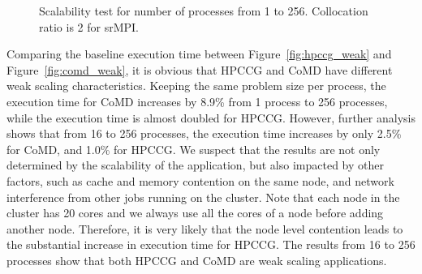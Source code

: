 \begin{figure}[!t]
	\begin{center}
	\end{center}
	\caption{Scalability test for number of processes from 1 to 256. Collocation ratio is 2 for srMPI.}
	\label{fig:scalability}
    \vspace{-0.1in}
\end{figure}

Comparing the baseline execution time between Figure~\ref{fig:hpccg_weak} and Figure~\ref{fig:comd_weak}, it is obvious that HPCCG and CoMD have different weak scaling characteristics. Keeping the same problem size per process, the execution time for CoMD increases by 8.9\% from 1 process to 256 processes, while the execution time is almost doubled for HPCCG. However, further analysis shows that from 16 to 256 processes, the execution time increases by only 2.5\% for CoMD, and 1.0\% for HPCCG. We suspect that the results are not only determined by the scalability of the application, but also impacted by other factors, such as cache and memory contention on the same node, and network interference from other jobs running on the cluster. Note that each node in the cluster has 20 cores and we always use all the cores of a node before adding another node. Therefore, it is very likely that the node level contention leads to the substantial increase in execution time for HPCCG. The results from 16 to 256 processes show that both HPCCG and CoMD are weak scaling applications. 

